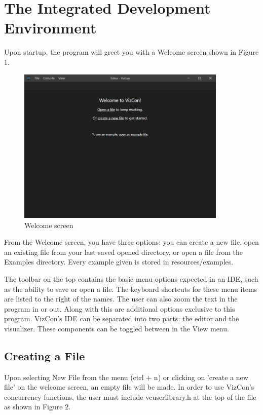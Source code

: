 \documentclass{article}
\begin{document}
\section{The Integrated Development Environment}
Upon startup, the program will greet you with a Welcome screen shown in Figure 1. 
\begin{figure}[h!]
    \includegraphics[width=10cm]{vizconWelcomeScreen}
    \centering
    \caption{Welcome screen}
\end{figure}

From the Welcome screen, you have three options: you can create a new file, open an existing file from your last saved opened directory, or open a file from the Examples directory. Every example given is stored in resources/examples.

The toolbar on the top contains the basic menu options expected in an IDE, such as the ability to save or open a file. The keyboard shortcuts for these menu items are listed to the right of the names. The user can also zoom the text in the program in or out. Along with this are additional options exclusive to this program. VizCon's IDE can be separated into two parts: the editor and the visualizer. These components can be toggled between in the View menu.

\subsection{Creating a File}
Upon selecting New File from the menu (ctrl + n) or clicking on 'create a new file' on the welcome screen, an empty file will be made. In order to use VizCon's concurrency functions, the user must include vcuserlibrary.h at the top of the file as shown in Figure 2. 
\end{document}
